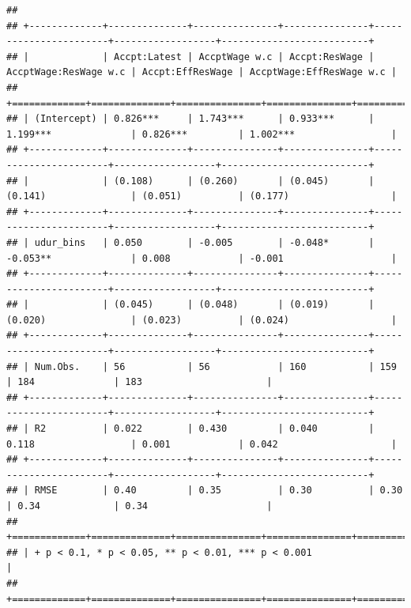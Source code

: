 \documentclass[
]{article}
\begin{document}
\begin{verbatim}
## 
## +-------------+--------------+---------------+---------------+-----------------------+------------------+--------------------------+
## |             | Accpt:Latest | AccptWage w.c | Accpt:ResWage | AccptWage:ResWage w.c | Accpt:EffResWage | AccptWage:EffResWage w.c |
## +=============+==============+===============+===============+=======================+==================+==========================+
## | (Intercept) | 0.826***     | 1.743***      | 0.933***      | 1.199***              | 0.826***         | 1.002***                 |
## +-------------+--------------+---------------+---------------+-----------------------+------------------+--------------------------+
## |             | (0.108)      | (0.260)       | (0.045)       | (0.141)               | (0.051)          | (0.177)                  |
## +-------------+--------------+---------------+---------------+-----------------------+------------------+--------------------------+
## | udur_bins   | 0.050        | -0.005        | -0.048*       | -0.053**              | 0.008            | -0.001                   |
## +-------------+--------------+---------------+---------------+-----------------------+------------------+--------------------------+
## |             | (0.045)      | (0.048)       | (0.019)       | (0.020)               | (0.023)          | (0.024)                  |
## +-------------+--------------+---------------+---------------+-----------------------+------------------+--------------------------+
## | Num.Obs.    | 56           | 56            | 160           | 159                   | 184              | 183                      |
## +-------------+--------------+---------------+---------------+-----------------------+------------------+--------------------------+
## | R2          | 0.022        | 0.430         | 0.040         | 0.118                 | 0.001            | 0.042                    |
## +-------------+--------------+---------------+---------------+-----------------------+------------------+--------------------------+
## | RMSE        | 0.40         | 0.35          | 0.30          | 0.30                  | 0.34             | 0.34                     |
## +=============+==============+===============+===============+=======================+==================+==========================+
## | + p < 0.1, * p < 0.05, ** p < 0.01, *** p < 0.001                                                                                |
## +=============+==============+===============+===============+=======================+==================+==========================+

\end{verbatim}
\end{document}
